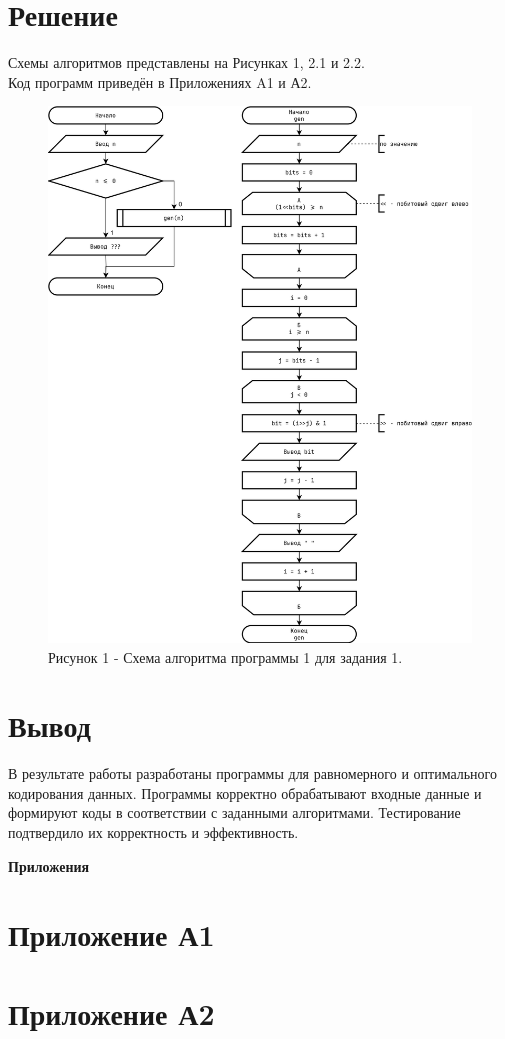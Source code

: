 \documentclass[oneside,a4paper,14pt]{extarticle}
\begin{document}
\section*{Решение}
\noindent Схемы алгоритмов представлены на Рисунках 1, 2.1 и 2.2. \\
\noindent Код программ приведён в Приложениях A1 и А2.\\
\begin{figure}[h!]
	\centering
	\includegraphics[height=0.75\textheight]{pics/flowchart_1.png}
	\caption*{Рисунок 1 - Схема алгоритма программы 1 для задания 1.}
\end{figure}


\newpage
\section*{Вывод}
В результате работы разработаны программы для равномерного и оптимального
кодирования данных. Программы корректно обрабатывают входные данные и формируют
коды в соответствии с заданными алгоритмами. Тестирование подтвердило их
корректность и эффективность.\\
\newpage
\begin{flushright}
    \textcolor{black!30}{\textbf{Приложения}}
\end{flushright}
\section*{Приложение А1}
\newpage
\section*{Приложение А2}
\end{document}
